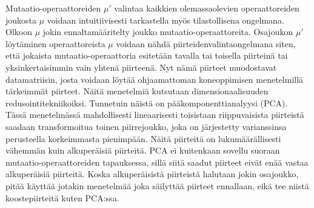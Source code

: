 \documentclass[finnish]{tktltiki2}
\begin{document}
Mutaatio-operaattoreiden $\mu'$ valintaa kaikkien olemassaolevien operaattoreiden joukosta $\mu$ voidaan intuitiivisesti tarkastella myös tilastollisena ongelmana. Olkoon $\mu$ jokin ennaltamääritelty joukko mutaatio-operaattoreita. Osajoukon $\mu'$ löytäminen operaattoreista $\mu$ voidaan nähdä piirteidenvalintaongelmana siten, että jokaista mutaatio-operaattoria esitetään tavalla tai toisella piirteinä tai yksinkertaisimmin vain yhtenä piirteenä. Nyt nämä piirteet muodostavat datamatriisin, josta voidaan löytää ohjaamattoman koneoppimisen menetelmillä tärkeimmät piirteet. Näitä menetelmiä kutsutaan dimensionaalisuuden redusointitekniikoiksi. Tunnetuin näistä on pääkomponenttianalyysi (PCA). Tässä menetelmässä mahdollisesti lineaarisesti toisistaan riippuvaisista piirteistä saadaan transformoitua toinen piirrejoukko, joka on järjestetty varianssinsa perusteella korkeimmasta pienimpään. Näitä piirteitä on lukumäärällisesti vähemmän kuin alkuperäisiä piirteitä. PCA ei kuitenkaan sovellu suoraan mutaatio-operaattoreiden tapauksessa, sillä siitä saadut piirteet eivät enää vastaa alkuperäisiä piirteitä. Koska alkuperäisistä piirteistä halutaan jokin osajoukko, pitää käyttää jotakin menetelmää joka säilyttää piirteet ennallaan, eikä tee niistä koostepiirteitä kuten PCA:ssa. 
\end{document}
